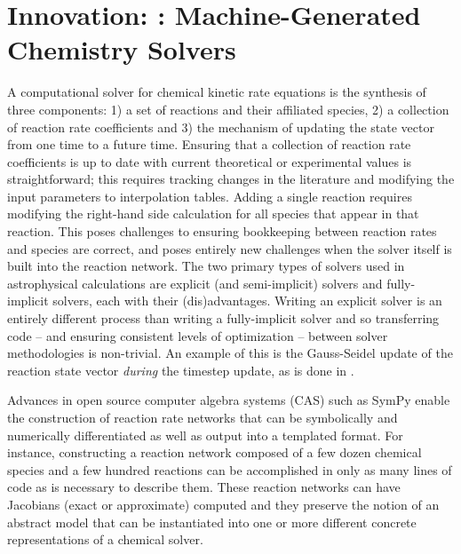 \section{Innovation: \dengo{}: Machine-Generated Chemistry Solvers}

A computational solver for chemical kinetic rate equations is the synthesis of
three components: 1) a set of reactions and their affiliated species,
2) a collection of reaction rate coefficients and 3) the mechanism of updating
the state vector from one time to a future time.  Ensuring that a collection of
reaction rate coefficients is up to date with current theoretical or
experimental values is straightforward; this requires tracking changes in the
literature and modifying the input parameters to interpolation tables.
Adding a single reaction requires modifying the right-hand side
calculation for all species that appear in that reaction.  This poses
challenges to ensuring bookkeeping between reaction rates and species are
correct, and poses entirely new challenges when the solver itself is built into
the reaction network.  The two primary types of solvers used in astrophysical
calculations are explicit (and semi-implicit) solvers and fully-implicit
solvers, each with their (dis)advantages.  Writing an explicit solver is an
entirely different process than writing a fully-implicit solver and so
transferring code -- and ensuring consistent levels of optimization -- between
solver methodologies is non-trivial.  An example of this is the Gauss-Seidel
update of the reaction state vector \textit{during} the timestep update, as is
done in \grackle{}.

Advances in open source computer algebra systems (CAS) such as SymPy
\citep{10.7717/peerj-cs.103} enable the construction
of reaction rate networks that can be symbolically and numerically
differentiated as well as output into a templated format.  For instance,
constructing a reaction network composed of a few dozen chemical species and a
few hundred reactions can be accomplished in only as many lines of code as is
necessary to describe them.  These reaction networks can have Jacobians (exact
or approximate) computed and they preserve the notion of an abstract model that
can be instantiated into one or more different concrete representations of a
chemical solver.


